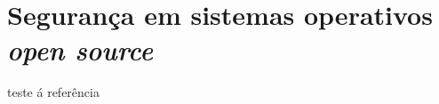 \section{Segurança em sistemas operativos \textit{open source}} \label{section: segurança}
teste á referência\cite{openSourceSecurity}